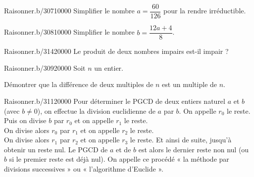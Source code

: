 %




\begin{pageAuto} 

 
\begin{ExoAuto}{Raisonner.}{b/307}{1}{0}{0}{0}{0}
Simplifier le nombre $a=\dfrac{60}{126}$ pour la rendre irréductible. 
\end{ExoAuto}
\begin{ExoAuto}{Raisonner.}{b/308}{1}{0}{0}{0}{0}
Simplifier le nombre $b=\dfrac{12a+4}{8}$. 
\end{ExoAuto}
\begin{ExoAuto}{Raisonner.}{b/314}{2}{0}{0}{0}{0}
Le produit de deux nombres impairs est-il impair ? 
\end{ExoAuto}


\begin{ExoAuto}{Raisonner.}{b/309}{2}{0}{0}{0}{0}
Soit $n$ un entier.

Démontrer que la différence de deux multiples de $n$ est un multiple de $n$. 
\end{ExoAuto}

\begin{ExoAuto}{Raisonner.}{b/311}{2}{0}{0}{0}{0}
  Pour déterminer le PGCD de deux entiers naturel $a$ et $b$ (avec $b \neq 0$),
  on effectue la division euclidienne de $a$ par $b$. On appelle $r_0$ le reste. \\
Puis on divise $b$ par $r_0$ et on appelle $r_1$ le reste. \\
On divise alors $r_0$ par $r_1$ et on appelle $r_2$ le reste.\\ 
On divise alors $r_1$ par $r_2$ et on appelle $r_3$ le reste. Et ainsi de suite,
jusqu'à obtenir un reste nul. 
Le PGCD de $a$ et de $b$ est alors le dernier reste non nul (ou $b$
si le premier reste est déjà nul).
On appelle ce procédé « la méthode par divisions successives » ou
« l'algorithme d'Euclide ». 


\end{ExoAuto}
\end{pageAuto}

